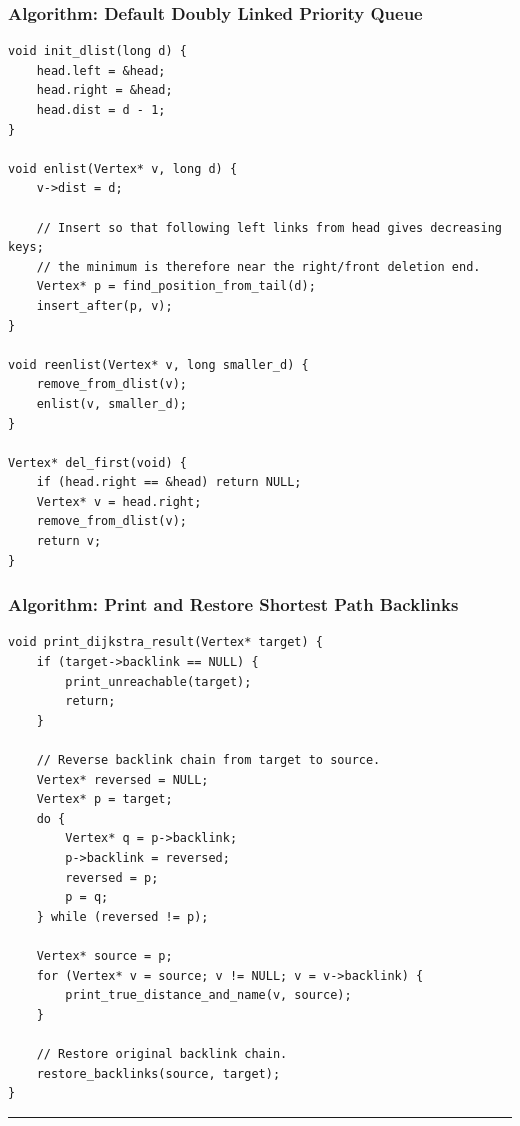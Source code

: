 \documentclass[11pt]{article}
\begin{document}
\subsubsection{Algorithm: Default Doubly Linked Priority Queue}\label{algorithm-default-doubly-linked-priority-queue}

\begin{verbatim}
void init_dlist(long d) {
    head.left = &head;
    head.right = &head;
    head.dist = d - 1;
}

void enlist(Vertex* v, long d) {
    v->dist = d;

    // Insert so that following left links from head gives decreasing keys;
    // the minimum is therefore near the right/front deletion end.
    Vertex* p = find_position_from_tail(d);
    insert_after(p, v);
}

void reenlist(Vertex* v, long smaller_d) {
    remove_from_dlist(v);
    enlist(v, smaller_d);
}

Vertex* del_first(void) {
    if (head.right == &head) return NULL;
    Vertex* v = head.right;
    remove_from_dlist(v);
    return v;
}
\end{verbatim}

\subsubsection{Algorithm: Print and Restore Shortest Path Backlinks}\label{algorithm-print-and-restore-shortest-path-backlinks}

\begin{verbatim}
void print_dijkstra_result(Vertex* target) {
    if (target->backlink == NULL) {
        print_unreachable(target);
        return;
    }

    // Reverse backlink chain from target to source.
    Vertex* reversed = NULL;
    Vertex* p = target;
    do {
        Vertex* q = p->backlink;
        p->backlink = reversed;
        reversed = p;
        p = q;
    } while (reversed != p);

    Vertex* source = p;
    for (Vertex* v = source; v != NULL; v = v->backlink) {
        print_true_distance_and_name(v, source);
    }

    // Restore original backlink chain.
    restore_backlinks(source, target);
}
\end{verbatim}

\begin{center}\rule{0.5\linewidth}{0.5pt}\end{center}
\end{document}
